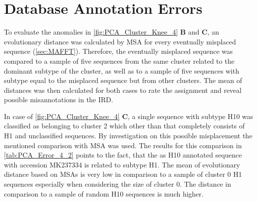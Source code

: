\section{Database Annotation Errors} \label{sec:Clustering_Anomalies}

To evaluate the anomalies in \autoref{fig:PCA_Cluster_Knee_4} \textbf{\textsf{B}} and \textbf{\textsf{C}}, an evolutionary distance was calculated by \gls{MSA} for every eventually misplaced sequence (\autoref{sec:MAFFT}). Therefore, the eventually misplaced sequence was compared to a sample of five sequences from the same cluster related to the dominant subtype of the cluster, as well as to a sample of five sequences with subtype equal to the misplaced sequence but from other clusters. The mean of distances was then calculated for both cases to rate the assignment and reveal possible misannotations in the \gls{IRD}. 

\begin{table}[!hbt]
    \centering
    \caption[Anomalies in Segment 4 Cluster 2 (\Acrshort{PCA})]{\textbf{Anomalies in Segment 4 Cluster 2 (\Acrshort{PCA}).} The \glspl{MSA} mean distance of the given sequences in comparison to a sample of H1 sequences of the same cluster and a sample of H10 sequences present in other clusters.}
    \label{tab:PCA_Error_4_2}
\end{table}

In case of \autoref{fig:PCA_Cluster_Knee_4} \textbf{\textsf{C}}, a single sequence with subtype H10 was classified as belonging to cluster 2 which other than that completely consists of H1 and unclassified sequences. By investigation on this possible misplacement the mentioned comparison with \gls{MSA} was used. The results for this comparison in \autoref{tab:PCA_Error_4_2} points to the fact, that the as H10 annotated sequence with accession MK237334 is related to subtype H1. The mean of evolutionary distance based on \glspl{MSA} is very low in comparison to a sample of cluster 0 H1 sequences especially when considering the size of cluster 0. The distance in comparison to a sample of random H10 sequences is much higher. 

